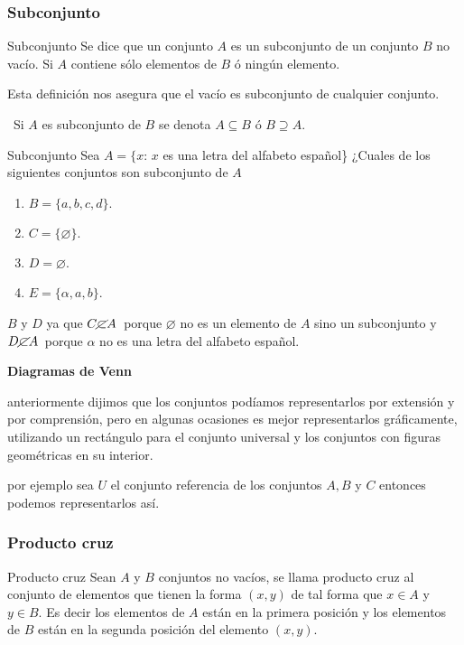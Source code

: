 \subsubsection{Subconjunto}

\begin{definicionn}{ Subconjunto} Se dice que un conjunto $A$ es
un subconjunto de un conjunto $B$ no vacío. Si $A$ contiene sólo
elementos de $B$ ó ningún elemento. \end{definicionn}

Esta definición nos asegura que el vacío es subconjunto de cualquier
conjunto.

\notacion\ Si $A$ es subconjunto de $B$ se denota $A\subseteq B$
ó $B\supseteq A.$

\begin{ejem}{Subconjunto} Sea $A=\{x:\, x$ es una letra del alfabeto
español\} ¿Cuales de los siguientes conjuntos son subconjunto de $A$
\begin{enumerate}
\item $B=\{a,b,c,d\}.$
\item $C=\{\varnothing\}.$
\item $D=\varnothing$.
\item $E=\{\alpha,a,b\}$.
\end{enumerate}
\end{ejem}

\solucion $B$ y $D$ ya que $C\cancel\subset A $\, porque $\varnothing$
no es un elemento de $A$ sino un subconjunto y $D\cancel\subset A $\,
porque $\alpha$ no es una letra del alfabeto español.

\textsf{\textbf{Diagramas de Venn}}

anteriormente dijimos que los conjuntos podíamos representarlos por
extensión y por comprensión, pero en algunas ocasiones es mejor representarlos
gráficamente, utilizando un rectángulo para el conjunto universal
y los conjuntos con figuras geométricas en su interior.

por ejemplo sea $U$ el conjunto referencia de los conjuntos $A,B$
y $C$ entonces podemos representarlos así.


\subsubsection{Producto cruz}

\begin{definicionn}{Producto cruz} Sean $A$ y $B$ conjuntos no
vacíos, se llama producto cruz al conjunto de elementos que tienen
la forma $\left(x,y\right)$ de tal forma que $x\in A$ y $y\in B$.
Es decir los elementos de $A$ están en la primera posición y los
elementos de $B$ están en la segunda posición del elemento $\left(x,y\right).$
\end{definicionn}

